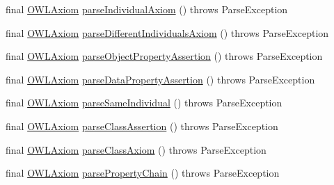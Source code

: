 \begin{DoxyCompactItemize}
\item 
final \hyperlink{interfaceorg_1_1semanticweb_1_1owlapi_1_1model_1_1_o_w_l_axiom}{O\-W\-L\-Axiom} \hyperlink{classuk_1_1ac_1_1manchester_1_1cs_1_1owlapi_1_1dlsyntax_1_1parser_1_1_d_l_syntax_parser_a026944deb017620ca1698536f4f07780}{parse\-Individual\-Axiom} ()  throws Parse\-Exception 
\item 
final \hyperlink{interfaceorg_1_1semanticweb_1_1owlapi_1_1model_1_1_o_w_l_axiom}{O\-W\-L\-Axiom} \hyperlink{classuk_1_1ac_1_1manchester_1_1cs_1_1owlapi_1_1dlsyntax_1_1parser_1_1_d_l_syntax_parser_a891017c3be30fc5389b2793c29574d63}{parse\-Different\-Individuals\-Axiom} ()  throws Parse\-Exception 
\item 
final \hyperlink{interfaceorg_1_1semanticweb_1_1owlapi_1_1model_1_1_o_w_l_axiom}{O\-W\-L\-Axiom} \hyperlink{classuk_1_1ac_1_1manchester_1_1cs_1_1owlapi_1_1dlsyntax_1_1parser_1_1_d_l_syntax_parser_ad7c4dc665edb0dd4df2be01727d6b8e5}{parse\-Object\-Property\-Assertion} ()  throws Parse\-Exception 
\item 
final \hyperlink{interfaceorg_1_1semanticweb_1_1owlapi_1_1model_1_1_o_w_l_axiom}{O\-W\-L\-Axiom} \hyperlink{classuk_1_1ac_1_1manchester_1_1cs_1_1owlapi_1_1dlsyntax_1_1parser_1_1_d_l_syntax_parser_a4d79509c89da4f464291c9eb016d6648}{parse\-Data\-Property\-Assertion} ()  throws Parse\-Exception 
\item 
final \hyperlink{interfaceorg_1_1semanticweb_1_1owlapi_1_1model_1_1_o_w_l_axiom}{O\-W\-L\-Axiom} \hyperlink{classuk_1_1ac_1_1manchester_1_1cs_1_1owlapi_1_1dlsyntax_1_1parser_1_1_d_l_syntax_parser_aa2d53867ccaebbea9f40b671bce22bf6}{parse\-Same\-Individual} ()  throws Parse\-Exception 
\item 
final \hyperlink{interfaceorg_1_1semanticweb_1_1owlapi_1_1model_1_1_o_w_l_axiom}{O\-W\-L\-Axiom} \hyperlink{classuk_1_1ac_1_1manchester_1_1cs_1_1owlapi_1_1dlsyntax_1_1parser_1_1_d_l_syntax_parser_adf9f41b0269a5947234f89fca118e846}{parse\-Class\-Assertion} ()  throws Parse\-Exception 
\item 
final \hyperlink{interfaceorg_1_1semanticweb_1_1owlapi_1_1model_1_1_o_w_l_axiom}{O\-W\-L\-Axiom} \hyperlink{classuk_1_1ac_1_1manchester_1_1cs_1_1owlapi_1_1dlsyntax_1_1parser_1_1_d_l_syntax_parser_a29c8a821136ff208f01f4380cd8343b4}{parse\-Class\-Axiom} ()  throws Parse\-Exception 
\item 
final \hyperlink{interfaceorg_1_1semanticweb_1_1owlapi_1_1model_1_1_o_w_l_axiom}{O\-W\-L\-Axiom} \hyperlink{classuk_1_1ac_1_1manchester_1_1cs_1_1owlapi_1_1dlsyntax_1_1parser_1_1_d_l_syntax_parser_abcc0b3a34613bf2fe370b1f04a690d5b}{parse\-Property\-Chain} ()  throws Parse\-Exception 

\end{DoxyCompactItemize}
